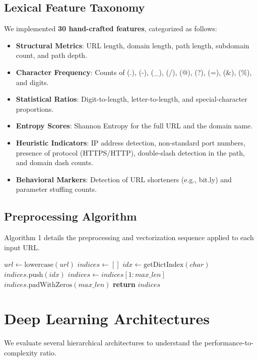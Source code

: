 \documentclass[journal,twocolumn]{IEEEtran}
\begin{document}
\subsection{Lexical Feature Taxonomy}
We implemented \textbf{30 hand-crafted features}, categorized as follows:
\begin{itemize}[leftmargin=*]
    \item \textbf{Structural Metrics}: URL length, domain length, path length, subdomain count, and path depth.
    \item \textbf{Character Frequency}: Counts of (.), (-), (\_), (/), (@), (?), (=), (\&), (\%), and digits.
    \item \textbf{Statistical Ratios}: Digit-to-length, letter-to-length, and special-character proportions.
    \item \textbf{Entropy Scores}: Shannon Entropy for the full URL and the domain name.
    \item \textbf{Heuristic Indicators}: IP address detection, non-standard port numbers, presence of protocol (HTTPS/HTTP), double-slash detection in the path, and domain dash counts.
    \item \textbf{Behavioral Markers}: Detection of URL shorteners (e.g., bit.ly) and parameter stuffing counts.
\end{itemize}

\subsection{Preprocessing Algorithm}
Algorithm 1 details the preprocessing and vectorization sequence applied to each input URL.

\begin{algorithm}
\caption{URL Preprocessing and Sequence Generation}
\begin{algorithmic}[1]
    \State $url \gets \text{lowercase}(url)$
    \State $indices \gets [ ]$
        \State $idx \gets \text{getDictIndex}(char)$
        \State $indices.\text{push}(idx)$
    \EndFor
        \State $indices \gets indices[1 : max\_len]$
    \Else
        \State $indices.\text{padWithZeros}(max\_len)$
    \EndIf
    \State \textbf{return} $indices$
\EndProcedure
\end{algorithmic}
\end{algorithm}

\section{Deep Learning Architectures}
We evaluate several hierarchical architectures to understand the performance-to-complexity ratio.
\end{document}
